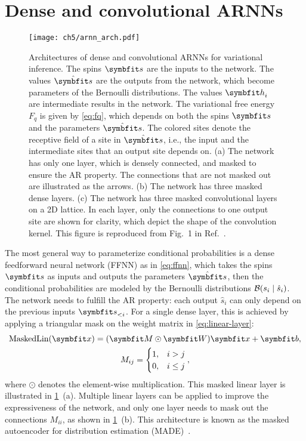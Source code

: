 \section{Dense and convolutional ARNNs}
\label{sec:made}

\begin{figure}[htb]
\centering
\texttt{[image: ch5/arnn\_arch.pdf]}
\caption[Architectures of autoregressive neural networks (ARNNs)]{
Architectures of dense and convolutional ARNNs for variational inference.
The spins $\vs$ are the inputs to the network.
The values $\hat{\vs}$ are the outputs from the network, which become parameters of the Bernoulli distributions.
The values $\vh_i$ are intermediate results in the network.
The variational free energy $F_q$ is given by \cref{eq:fq}, which depends on both the spins $\vs$ and the parameters $\hat{\vs}$.
The colored sites denote the receptive field of a site in $\hat{\vs}$, i.e., the input and the intermediate sites that an output site depends on.
(a) The network has only one layer, which is densely connected, and masked to ensure the AR property. The connections that are not masked out are illustrated as the arrows.
(b) The network has three masked dense layers.
(c) The network has three masked convolutional layers on a 2D lattice. In each layer, only the connections to one output site are shown for clarity, which depict the shape of the convolution kernel.
This figure is reproduced from Fig.~1 in Ref.~\cite{wu2019solving}.
}
\label{fig:arnn-arch}
\end{figure}

The most general way to parameterize conditional probabilities is a dense feedforward neural network (FFNN) as in \cref{eq:ffnn}, which takes the spins $\vs$ as inputs and outputs the parameters $\hat{\vs}$, then the conditional probabilities are modeled by the Bernoulli distributions $\mathcal{B}(s_i \mid \hat{s}_i)$. The network needs to fulfill the AR property: each output $\hat{s}_i$ can only depend on the previous inputs $\vs_{< i}$. For a single dense layer, this is achieved by applying a triangular mask on the weight matrix in \cref{eq:linear-layer}:
\begin{gather}
\text{MaskedLin}(\vx) = (\mM \odot \mW) \vx + \vb, \\
M_{i j} = \begin{cases}
1, & i > j \\
0, & i \le j
\end{cases},
\end{gather}
where $\odot$ denotes the element-wise multiplication. This masked linear layer is illustrated in \cref{fig:arnn-arch}~(a). Multiple linear layers can be applied to improve the expressiveness of the network, and only one layer needs to mask out the connections $M_{i i}$, as shown in \cref{fig:arnn-arch}~(b). This architecture is known as the masked autoencoder for distribution estimation (MADE)~\cite{germain2015made}.

